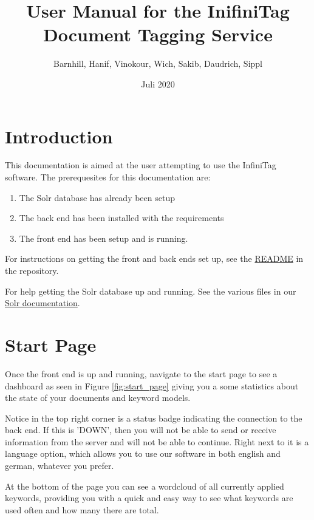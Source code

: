 \documentclass{article}
\title{User Manual for the InifiniTag Document Tagging Service}
\author{Barnhill, Hanif, Vinokour, Wich, Sakib, Daudrich, Sippl}
\date{Juli 2020}
\begin{document}
\maketitle
\tableofcontents

\newpage

\section{Introduction}
This documentation is aimed at the user attempting to use the InfiniTag software. The prerequesites
for this documentation are:

\begin{enumerate}
    \item The Solr database has already been setup
    \item The back end has been installed with the requirements
    \item The front end has been setup and is running.
\end{enumerate}

\bigskip
\noindent
For instructions on getting the front and back ends set up, see the \href{https://github.com/AMOS-5/infinitag/blob/master/README.md}{README} in the repository.

\bigskip
\noindent
For help getting the Solr database up and running. See the various files in our \href{https://github.com/AMOS-5/infinitag/tree/master/docs/solr}{Solr documentation}.



\section{Start Page}
\label{docoverview}

Once the front end is up and running, navigate to the start page to see a dashboard as seen in Figure \ref{fig:start_page} giving you a some statistics about the state of your documents and keyword models.

Notice in the top right corner is a status badge indicating the connection to the back end. If this is 'DOWN', then you will not be able to send or receive information from the server and will not be able to continue.
Right next to it is a language option, which allows you to use our software in both english and german, whatever you prefer.

At the bottom of the page you can see a wordcloud of all currently applied keywords, providing you with a quick and easy way to see what keywords are used often and how many there are total.
\end{document}
